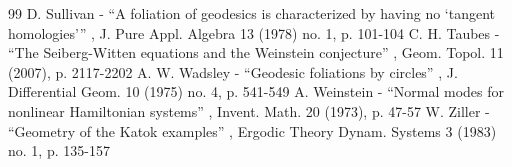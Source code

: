 \begin{thebibliography}{99}
 D. Sullivan - “A foliation of geodesics is characterized by having no ‘tangent homologies’” , J. Pure Appl. Algebra 13 (1978) no. 1, p. 101-104
 C. H. Taubes - “The Seiberg-Witten equations and the Weinstein conjecture” , Geom. Topol. 11 (2007), p. 2117-2202
 A. W. Wadsley - “Geodesic foliations by circles” , J. Differential Geom. 10 (1975) no. 4, p. 541-549
 A. Weinstein - “Normal modes for nonlinear Hamiltonian systems” , Invent. Math. 20 (1973), p. 47-57
 W. Ziller - “Geometry of the Katok examples” , Ergodic Theory Dynam. Systems 3 (1983) no. 1, p. 135-157
\end{thebibliography}

